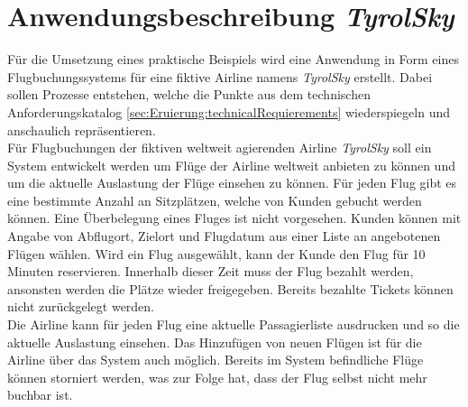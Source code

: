\section{Anwendungsbeschreibung \textit{TyrolSky}}
Für die Umsetzung eines praktische Beispiels wird eine Anwendung in Form eines Flugbuchungssystems für eine fiktive Airline namens \textit{TyrolSky} erstellt. Dabei sollen Prozesse entstehen, welche die Punkte aus dem technischen Anforderungskatalog \ref{sec:Eruierung:technicalRequierements} wiederspiegeln und anschaulich repräsentieren. \\
Für Flugbuchungen der fiktiven weltweit agierenden Airline \textit{TyrolSky} soll ein System entwickelt werden um Flüge der Airline weltweit anbieten zu können und um die aktuelle Auslastung der Flüge einsehen zu können. Für jeden Flug gibt es eine bestimmte Anzahl an Sitzplätzen, welche von Kunden gebucht werden können. Eine Überbelegung eines Fluges ist nicht vorgesehen. Kunden können mit Angabe von Abflugort, Zielort und Flugdatum aus einer Liste an angebotenen Flügen wählen. Wird ein Flug ausgewählt, kann der Kunde den Flug für 10 Minuten reservieren. Innerhalb dieser Zeit muss der Flug bezahlt werden, ansonsten werden die Plätze wieder freigegeben. Bereits bezahlte Tickets können nicht zurückgelegt werden.  \\
Die Airline kann für jeden Flug eine aktuelle Passagierliste ausdrucken und so die aktuelle Auslastung einsehen. Das Hinzufügen von neuen Flügen ist für die Airline über das System auch möglich. Bereits im System befindliche Flüge können storniert werden, was zur Folge hat, dass der Flug selbst nicht mehr buchbar ist. \\

